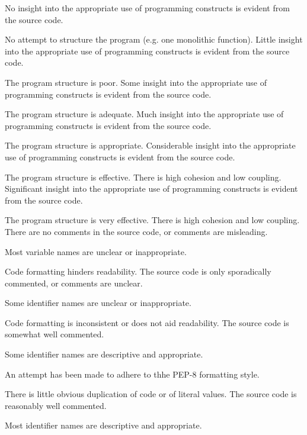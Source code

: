 \documentclass{../../fal_assignment}
\begin{document}
\begin{markingrubric}
        \grade\fail No insight into the appropriate use of programming constructs is evident from the source code.
            \par No attempt to structure the program (e.g. one monolithic function).
        \grade Little insight into the appropriate use of programming constructs is evident from the source code.
            \par The program structure is poor.
        \grade Some insight into the appropriate use of programming constructs is evident from the source code.
            \par The program structure is adequate.
        \grade Much insight into the appropriate use of programming constructs is evident from the source code.
            \par The program structure is appropriate.
        \grade Considerable insight into the appropriate use of programming constructs is evident from the source code.
            \par The program structure is effective. There is high cohesion and low coupling.
        \grade Significant insight into the appropriate use of programming constructs is evident from the source code.
            \par The program structure is very effective. There is high cohesion and low coupling.
%
        \grade\fail There are no comments in the source code, or comments are misleading.
            \par Most variable names are unclear or inappropriate.
            \par Code formatting hinders readability.
        \grade The source code is only sporadically commented, or comments are unclear.
            \par Some identifier names are unclear or inappropriate.
            \par Code formatting is inconsistent or does not aid readability.
        \grade The source code is somewhat well commented.
            \par Some identifier names are descriptive and appropriate.
            \par An attempt has been made to adhere to thhe PEP-8 formatting style.
             \par There is little obvious duplication of code or of literal values.           
        \grade The source code is reasonably well commented.
            \par Most identifier names are descriptive and appropriate.

\end{markingrubric}
\end{document}
